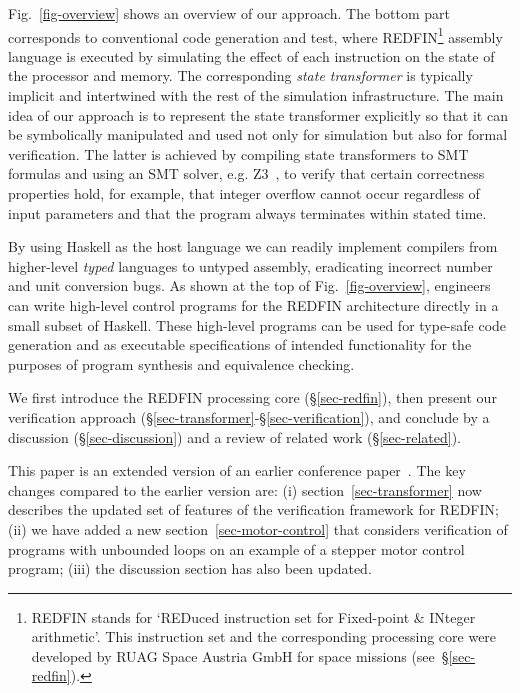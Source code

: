 Fig.~\ref{fig-overview} shows an overview of our approach. The bottom part
corresponds to conventional code generation and test, where
REDFIN\footnote{REDFIN stands for `REDuced instruction set for Fixed-point \&
INteger arithmetic'. This instruction set and the corresponding processing core
were developed by RUAG Space Austria GmbH for space missions
(see~\S\ref{sec-redfin}).} assembly language is executed by
simulating the effect of each instruction on the state of the processor and memory.
The corresponding \emph{state transformer} is typically implicit and intertwined
with the rest of the simulation infrastructure. The main idea of our approach is
to represent the state transformer explicitly so that it can be symbolically
manipulated and used not only for simulation but also for formal verification.
The latter is achieved by compiling state transformers to SMT formulas and using
an SMT solver, e.g. Z3~\cite{de2008z3}, to verify that certain correctness
properties hold, for example, that integer overflow cannot occur regardless of
input parameters and that the program always terminates within stated time.

By using Haskell as the host language we can readily implement compilers from
higher-level \emph{typed} languages to untyped assembly, eradicating incorrect
number and unit conversion bugs. As shown at the top of Fig.~\ref{fig-overview},
engineers can write high-level control programs for the REDFIN architecture
directly in a small subset of Haskell. These high-level programs can be used for
type-safe code generation and as executable specifications of intended
functionality for the purposes of program synthesis and equivalence checking.


We first introduce the REDFIN processing core (\S\ref{sec-redfin}), then
present our verification approach (\S\ref{sec-transformer}-\S\ref{sec-verification}),
and conclude by a discussion (\S\ref{sec-discussion}) and a review of related
work (\S\ref{sec-related}).

This paper is an extended version of an earlier conference
paper~\cite{redfin-hs-19}. The key changes compared to the earlier
version are: (i) section~\ref{sec-transformer} now describes the
updated set of features of the verification framework for REDFIN;
(ii) we have added a new section~\ref{sec-motor-control} that
considers verification of programs with unbounded loops on an
example of a stepper motor control program; (iii) the discussion
section has also been updated.